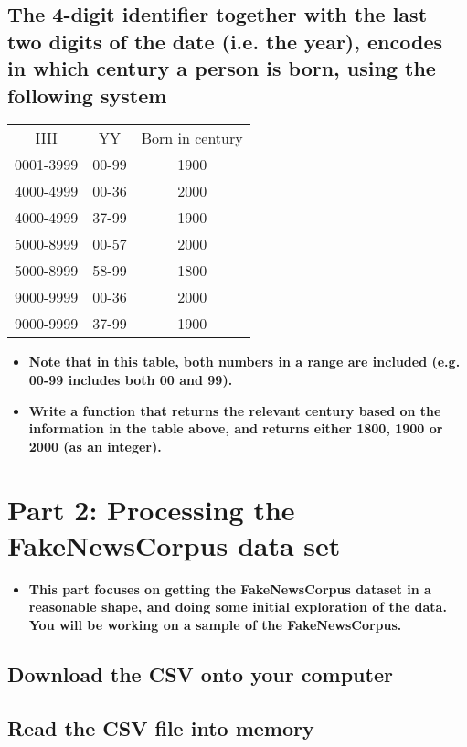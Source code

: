\documentclass[a4paper,12pt]{article}
\begin{document}
\subsection[]{The 4-digit identifier together with the last two digits of the date (i.e. the year), encodes in which century a person is born, using the following system}
\begin{center}
\begin{tabular}{|c|c|c|}
    \hline
    IIII & YY & Born in century\\
    0001-3999 & 00-99 & 1900\\
    4000-4999 & 00-36 & 2000\\
    4000-4999 & 37-99 & 1900\\
    5000-8999 & 00-57 & 2000\\
    5000-8999 & 58-99 & 1800\\
    9000-9999 & 00-36 & 2000\\
    9000-9999 & 37-99 & 1900\\
    \hline
\end{tabular}
\end{center}
\begin{itemize}
    \item[]\textbf{Note that in this table, both numbers in a range are included (e.g. 00-99 includes both 00 and 99).}
    \item[]\textbf{Write a function that returns the relevant century based on the information in the table above, and returns either 1800, 1900 or 2000 (as an integer).}
\end{itemize}







\section{Part 2: Processing the FakeNewsCorpus data set}
\begin{itemize}
    \item[]\textbf{This part focuses on getting the FakeNewsCorpus dataset in a reasonable shape, and doing some initial exploration of the data.  You will be working on a sample of the FakeNewsCorpus.}
\end{itemize}
\subsection[]{Download the CSV onto your computer}
\subsection[]{Read the CSV file into memory}
\end{document}
